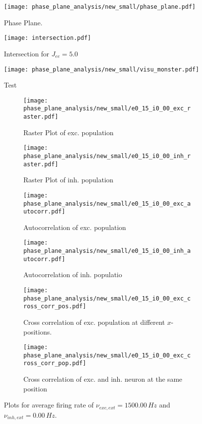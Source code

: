 \documentclass[a4paper,12pt]{article}
\begin{document}
    \begin{figure}
    \centering
        \texttt{[image: phase\_plane\_analysis/new\_small/phase\_plane.pdf]}
        \caption{Phase Plane.}
    \end{figure}
    
    \begin{figure}
    \centering
        \texttt{[image: intersection.pdf]}
        \caption{Intersection for $J_{ee} = 5.0$}
    \end{figure}
    \clearpage
    \begin{landscape}
    \begin{figure}
        \texttt{[image: phase\_plane\_analysis/new\_small/visu\_monster.pdf]}
        \caption{Test}
    \end{figure}
    \end{landscape}
    \clearpage
\begin{figure}
    \begin{subfigure}[b]{0.49\textwidth}
        \texttt{[image: phase\_plane\_analysis/new\_small/e0\_15\_i0\_00\_exc\_raster.pdf]}
        \caption{Raster Plot of exc. population}
    \end{subfigure}
    \begin{subfigure}[b]{0.49\textwidth}
        \texttt{[image: phase\_plane\_analysis/new\_small/e0\_15\_i0\_00\_inh\_raster.pdf]}
        \caption{Raster Plot of inh. population}
    \end{subfigure}
    \begin{subfigure}[b]{0.49\textwidth}
        \texttt{[image: phase\_plane\_analysis/new\_small/e0\_15\_i0\_00\_exc\_autocorr.pdf]}
        \caption{Autocorrelation of exc. population}
    \end{subfigure}
    \begin{subfigure}[b]{0.49\textwidth}
        \texttt{[image: phase\_plane\_analysis/new\_small/e0\_15\_i0\_00\_inh\_autocorr.pdf]}
        \caption{Autocorrelation of inh. populatio}
    \end{subfigure}
    \begin{subfigure}[b]{0.49\textwidth}
        \texttt{[image: phase\_plane\_analysis/new\_small/e0\_15\_i0\_00\_exc\_cross\_corr\_pos.pdf]}
        \caption{Cross correlation of exc. population at different $x$-positions.}
    \end{subfigure}
    \begin{subfigure}[b]{0.49\textwidth}
        \texttt{[image: phase\_plane\_analysis/new\_small/e0\_15\_i0\_00\_exc\_cross\_corr\_pop.pdf]}
        \caption{Cross correlation of exc. and inh. neuron at the same position}
    \end{subfigure}
    \caption{Plots for average firing rate of 
                $\nu_{exc,ext} = 1500.00 \,\si{Hz}$ and $\nu_{inh,ext} = 0.00 \,\si{Hz}$.
                }
\end{figure}
    
\end{document}
